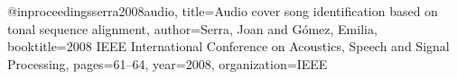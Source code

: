 @inproceedings{serra2008audio,
  title={Audio cover song identification based on tonal sequence alignment},
  author={Serra, Joan and G{\'o}mez, Emilia},
  booktitle={2008 IEEE International Conference on Acoustics, Speech and Signal Processing},
  pages={61--64},
  year={2008},
  organization={IEEE}
}